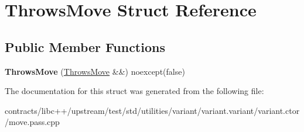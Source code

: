 \hypertarget{struct_throws_move}{}\section{Throws\+Move Struct Reference}
\label{struct_throws_move}
\subsection*{Public Member Functions}
\begin{DoxyCompactItemize}
\item 
\mbox{\label{struct_throws_move_ae19c868272b60708c69249187b9158ba}} 
{\bfseries Throws\+Move} (\mbox{\hyperlink{struct_throws_move}{Throws\+Move}} \&\&) noexcept(false)
\end{DoxyCompactItemize}


The documentation for this struct was generated from the following file\+:\begin{DoxyCompactItemize}
\item 
contracts/libc++/upstream/test/std/utilities/variant/variant.\+variant/variant.\+ctor/move.\+pass.\+cpp\end{DoxyCompactItemize}
